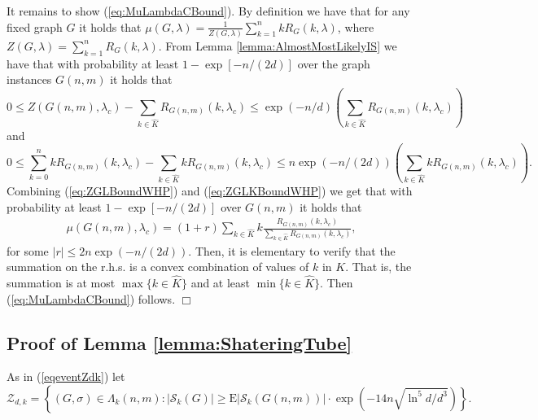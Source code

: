 \documentclass[a4paper,10pt]{article}
\makeatletter
\newenvironment{propositionproof}[1]{\noindent{\bf Proof of Proposition #1\@:}}{\hfill $\Box$\\}
\newcommand\cS{\mathcal{S}}
\newcommand\cZ{\mathcal{Z}}
\newcommand\Erw{\mathrm{E}}
\newcommand\bc[1]{\left({#1}\right)}
\newcommand\cbc[1]{\left\{{#1}\right\}}
\makeatother
\begin{document}
\begin{propositionproof}{\ref{prop:MostLikelyIS}}
It remains to show (\ref{eq:MuLambdaCBound}). By definition we have
that for any fixed graph $G$ it holds that 
$\mu(G,\lambda)=\frac{1}{Z(G,\lambda)}\sum_{k=1}^nkR_G(k,\lambda)$,
where $Z(G,\lambda)=\sum_{k=1}^nR_G(k,\lambda)$. From Lemma
\ref{lemma:AlmostMostLikelyIS} we have that with probability at least
$1-\exp\left[-n/(2d)\right]$ over the graph instances $G(n,m)$ 
it holds that
\begin{equation}\label{eq:ZGLBoundWHP}
0\leq Z(G(n,m),\lambda_c)-\sum_{k\in \hat{K}}R_{G(n,m)}(k,\lambda_c)\leq \exp\left(-n/d\right)\left(\sum_{k\in \hat{K}}R_{G(n,m)}(k,\lambda_c)\right)
\end{equation}
and 
\begin{equation}\label{eq:ZGLKBoundWHP}
0\leq \sum_{k=0}^nk R_{G(n,m)}(k,\lambda_c) -\sum_{k\in \hat{K} }kR_{G(n,m)}(k,\lambda_c)
\leq n\exp\left(-n/(2d)\right)\left(\sum_{k\in \hat{K}}kR_{G(n,m)}(k,\lambda_c)\right).
\end{equation}
Combining (\ref{eq:ZGLBoundWHP}) and (\ref{eq:ZGLKBoundWHP})
we get that with probability at least $1-\exp\left[-n/(2d)\right]$
over $G(n,m)$ it holds that
\begin{eqnarray}
\mu(G(n,m),\lambda_c)=(1+r)\sum_{k\in \hat{K}}k\frac{R_{G(n,m)}(k,\lambda_c)}{\sum_{k\in \hat{K}}R_{G(n,m)}(k,\lambda_c)},
\nonumber
\end{eqnarray}
for some $|r|\leq 2n\exp\left(-n/(2d)\right)$. Then, it is elementary to verify that
the summation on the r.h.s. is a convex combination of values of $k$ in
$K$. That is, the summation is at most $\max\{k\in \hat{K}\}$ and at 
least $\min\{k\in \hat{K}\}$. Then (\ref{eq:MuLambdaCBound}) follows.
\end{propositionproof}





\subsection{Proof of Lemma \ref{lemma:ShateringTube}}\label{sec:lemma:ShateringTube}


As in (\ref{eqeventZdk}) let 
\begin{displaymath}	
\cZ_{d,k}=\cbc{(G,\sigma)\in\Lambda_k(n,m):|\cS_k(G)|\geq\Erw|\cS_k(G(n,m))|\cdot\exp\bc{-14n\sqrt{\ln^5d/d^3}}}.
\end{displaymath}
\end{document}
